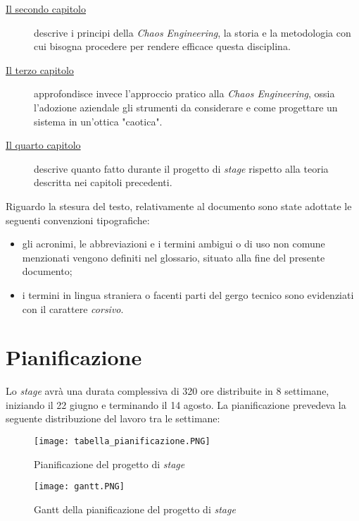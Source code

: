\begin{description}
    \item[{\hyperref[cap:processi-metodologie]{Il secondo capitolo}}] descrive i principi della \textit{Chaos Engineering}, la storia e la metodologia con cui bisogna procedere per rendere efficace questa disciplina.
    
    \item[{\hyperref[cap:descrizione-stage]{Il terzo capitolo}}] approfondisce invece l'approccio pratico alla \textit{Chaos Engineering}, ossia l'adozione aziendale gli strumenti da considerare e come progettare un sistema in un'ottica "caotica".
    
    \item[{\hyperref[cap:analisi-requisiti]{Il quarto capitolo}}] descrive quanto fatto durante il progetto di \textit{stage} rispetto alla teoria descritta nei capitoli precedenti.

\end{description}

Riguardo la stesura del testo, relativamente al documento sono state adottate le seguenti convenzioni tipografiche:
\begin{itemize}
	\item gli acronimi, le abbreviazioni e i termini ambigui o di uso non comune menzionati vengono definiti nel glossario, situato alla fine del presente documento;
	\item i termini in lingua straniera o facenti parti del gergo tecnico sono evidenziati con il carattere \emph{corsivo}.
\end{itemize}

\section{Pianificazione}
Lo \textit{stage} avrà una durata complessiva di 320 ore distribuite in 8 settimane, iniziando il 22 giugno e terminando il 14 agosto.
La pianificazione prevedeva la seguente distribuzione del lavoro tra le settimane:
\begin{figure}[H]
    \centering
    \texttt{[image: tabella\_pianificazione.PNG]}
    \label{tab:tabella-ore-stage}
    \caption{Pianificazione del progetto di \textit{stage}}
\end{figure}
\begin{figure}[H]
    \centering
    \texttt{[image: gantt.PNG]}
    \label{tab:gantt-stage}
    \caption{Gantt della pianificazione del progetto di \textit{stage}}
\end{figure}

